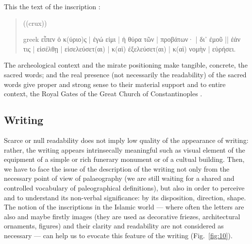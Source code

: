 \documentclass[amsthm,ebook]{saparticle}
\begin{document}
This the text of the inscription \citep[n. 505]{felle_biblia_2006}: 

\begin{quotation}
((crux)) \begin{otherlanguage*}{greek}
εἶπεν ὁ κ(ύριο)ς \textlatin{|} ἐγώ εἰμι \textlatin{|} ἡ θύρα τῶν \textlatin{|} προβάτων· \textlatin{|} δι᾿ ἐμοῦ \textlatin{||} ἐάν τις \textlatin{|} εἰσέλθῃ \textlatin{|} εἰσελεύσετ(αι) \textlatin{|} κ(αὶ) ἐξελεύσετ(αι) \textlatin{|} κ(αὶ) νομὴν \textlatin{|} εὑρήσει.
\end{otherlanguage*}


\end{quotation}

The archeological context and the mirate positioning make tangible, concrete, the sacred words; and the real presence
(not necessarily the readability) of the sacred words give proper and strong sense to their material support and to
entire context, the Royal Gates of the Great Church of Constantinoples \citep[320 and \emph{passim}]{felle_esporre_2015}.


\vspace{2cm}

\subsection{Writing}


\noindent Scarce or null readability does not imply low quality of the appearance of writing: rather, the writing appears
intrinsecally meaningful such as visual element of the equipment of a simple or rich funerary monument or of a cultual
building. Then, we have to face the issue of the description of the writing not only from the necessary point of
view of palaeography (we are still waiting for a shared and controlled vocabulary of paleographical definitions), but
also in order to perceive and to understand its non-verbal significance: by its disposition, direction, shape. The
notion of the inscriptions in the Islamic world --- where often the letters are also and maybe firstly images (they
are used as decorative friezes, architectural ornaments, figures) and their clarity and readability are not considered
as necessary --- can help us to evocate this feature of the writing (Fig.~\ref{fig:10}).
\end{document}
